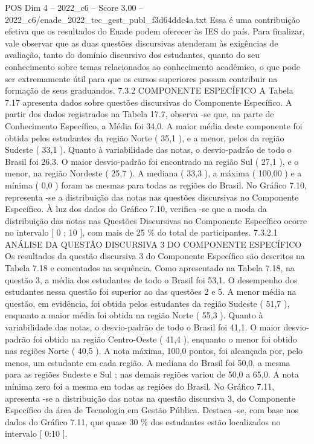 \begin{textsample}{POS Dim 4 – 2022\_c6 – Score 3.00 – 2022\_c6/enade\_2022\_tec\_gest\_publ\_f3d64ddc4a.txt}
Essa é uma contribuição efetiva que os resultados do Enade podem oferecer às IES do país.
Para finalizar, vale observar que as duas questões discursivas atenderam às exigências de avaliação, tanto do domínio discursivo dos estudantes, quanto do seu conhecimento sobre temas relacionados ao conhecimento acadêmico, o que pode ser extremamente útil para que os cursos superiores possam contribuir na formação de seus graduandos. 7.3.2 COMPONENTE ESPECÍFICO A Tabela 7.17 apresenta dados sobre questões discursivas do Componente Específico.
A partir dos dados registrados na Tabela 17.7, observa -se que, na parte de Conhecimento Específico, a Média foi 34,0.
A maior média deste componente foi obtida pelos estudantes da região Norte ( 35,1 ), e a menor, pelos da região Sudeste ( 33,1 ).
Quanto à variabilidade das notas, o desvio-padrão de todo o Brasil foi 26,3.
O maior desvio-padrão foi encontrado na região Sul ( 27,1 ), e o menor, na região Nordeste ( 25,7 ).
A mediana ( 33,3 ), a máxima ( 100,00 ) e a mínima ( 0,0 ) foram as mesmas para todas as regiões do Brasil.
No Gráfico 7.10, representa -se a distribuição das notas nas questões discursivas no Componente Específico.
À luz dos dados do Gráfico 7.10, verifica -se que a moda da distribuição das notas nas Questões Discursivas no Componente Específico ocorre no intervalo [ 0 ; 10 ], com mais de 25 \% do total de participantes. 7.3.2.1 ANÁLISE DA QUESTÃO DISCURSIVA 3 DO COMPONENTE ESPECÍFICO Os resultados da questão discursiva 3 do Componente Específico são descritos na Tabela 7.18 e comentados na sequência.
Como apresentado na Tabela 7.18, na questão 3, a média dos estudantes de todo o Brasil foi 53,1.
O desempenho dos estudantes nessa questão foi superior ao das questões 2 e 5.
A menor média na questão, em evidência, foi obtida pelos estudantes da região Sudeste ( 51,7 ), enquanto a maior média foi obtida na região Norte ( 55,3 ).
Quanto à variabilidade das notas, o desvio-padrão de todo o Brasil foi 41,1.
O maior desvio-padrão foi obtido na região Centro-Oeste ( 41,4 ), enquanto o menor foi obtido nas regiões Norte ( 40,5 ).
A nota máxima, 100,0 pontos, foi alcançada por, pelo menos, um estudante em cada região.
A mediana do Brasil foi 50,0, a mesma para as regiões Sudeste e Sul ; nas demais regiões variou de 50,0 a 65,0.
A nota mínima zero foi a mesma em todas as regiões do Brasil.
No Gráfico 7.11, apresenta -se a distribuição das notas na questão discursiva 3, do Componente Específico da área de Tecnologia em Gestão Pública.
Destaca -se, com base nos dados do Gráfico 7.11, que quase 30 \% dos estudantes estão localizados no intervalo [ 0:10 ].

\end{textsample}
